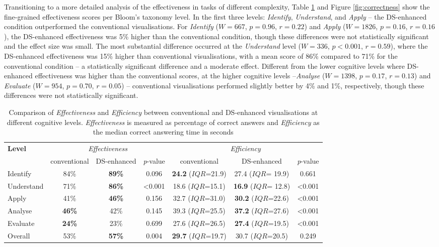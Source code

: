 Transitioning to a more detailed analysis of the effectiveness in tasks of different complexity, Table \ref{tab:correctness_efficiency} and Figure \ref{fig:correctness} show the fine-grained effectiveness scores per Bloom's taxonomy level. In the first three levels: \textit{Identify}, \textit{Understand}, and \textit{Apply} -- the DS-enhanced condition outperformed the conventional visualisations. For \textit{Identify} ($W=667$, $p=0.96$, $r=0.22$) and \textit{Apply} ($W=1826$, $p=0.16$, $r=0.16$), the DS-enhanced effectiveness was 5\% higher than the conventional condition, though these differences were not statistically significant and the effect size was small. The most substantial difference occurred at the \textit{Understand} level ($W=336$, $p<0.001$, $r=0.59$), where the DS-enhanced effectiveness was 15\% higher than conventional visualisations, with a mean score of 86\% compared to 71\% for the conventional condition -- a statistically significant difference and a moderate effect. Different from the lower cognitive levels where DS-enhanced effectiveness was higher than the conventional scores, at the higher cognitive levels --\textit{Analyse} ($W=1398$, $p=0.17$, $r=0.13$) and \textit{Evaluate} ($W=954$, $p=0.70$, $r=0.05$) -- conventional visualisations performed slightly better by 4\% and 1\%, respectively, though these differences were not statistically significant.

\begin{table}[t]
\centering
\caption{Comparison of \textit{Effectiveness} and \textit{Efficiency} between conventional and DS-enhanced visualisations at different cognitive levels. \textit{Effectiveness} is measured as percentage of correct answers and \textit{Efficiency} as the median correct answering time in seconds}
\begin{tabular}{l|ccc|ccc}
\toprule
\multirow{2}{*}{\textbf{Level}} & \multicolumn{3}{c|}{\textit{Effectiveness}} & \multicolumn{3}{c}{\textit{Efficiency}} \vspace{0.8mm}  \\ 
\cline{2-7}
 & conventional & DS-enhanced & \textit{p}-value & conventional & DS-enhanced  & \textit{p}-value \vspace{0.8mm} \\ \midrule
Identify & 84\% & \textbf{89\%} & 0.096 & \textbf{24.2} ($IQR$=21.9) & 27.4 ($IQR$= 19.9) & 0.661\\
Understand & 71\% & \textbf{86\%} & <0.001 & 18.6 ($IQR$=15.1) & \textbf{16.9} ($IQR$= 12.8) & <0.001 \\
Apply & 41\% & \textbf{46\%} & 0.156 & 32.7 ($IQR$=31.0) & \textbf{30.2} ($IQR$=22.6) & <0.001 \\
Analyse & \textbf{46\%} & 42\% & 0.145 & 39.3 ($IQR$=25.5) & \textbf{37.2} ($IQR$=27.6) & <0.001 \\ 
Evaluate & \textbf{24\%} & 23\% & 0.699 & 27.6 ($IQR$=26.5) & \textbf{27.4} ($IQR$=19.5) & <0.001 \\ 
Overall & 53\% & \textbf{57\%} & 0.004 & \textbf{29.7} ($IQR$=19.7) & 30.7 ($IQR$=20.5) & 0.249 \\ \bottomrule
\end{tabular}
\label{tab:correctness_efficiency}
\end{table}

